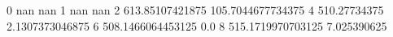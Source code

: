 0 nan nan
1 nan nan
2 613.85107421875 105.7044677734375
4 510.27734375 2.1307373046875
6 508.1466064453125 0.0
8 515.1719970703125 7.025390625

